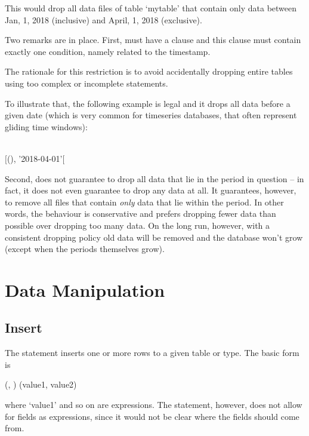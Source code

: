 This would drop all data files of table `mytable'
that contain only data between Jan, 1, 2018 (inclusive) and
April, 1, 2018 (exclusive). 

Two remarks are in place. First,
 must have a  clause
and this clause must contain exactly one condition,
namely  related to the timestamp.

The rationale for this restriction is
to avoid accidentally dropping entire tables
using too complex or incomplete  statements.

To illustrate that, the following example 
is legal and it drops all data
before a given date (which is very common
for timeseries databases, that often represent gliding
time windows):

\begin{minipage}{\textwidth}
  \\
$[$(), '2018-04-01'$[$
\end{minipage}

Second,  does not guarantee
to drop all data that lie in the period in question --
in fact, it does not even guarantee to drop any data at all.
It guarantees, however, to remove all files
that contain \emph{only} data that lie within the period.
In other words, the behaviour is conservative
and prefers dropping fewer data than possible over
dropping too many data.
On the long run, however, with a consistent dropping policy
old data will be removed and the database
won't grow (except when the periods themselves grow).

\section{Data Manipulation}
\subsection{Insert}
The  statement inserts one or more rows
to a given table or type.
The basic form is

  
                      (,
                       )
                      (value1, value2)

where `value1' and so on are expressions.
The  statement, however,
does not allow for fields as expressions,
since it would not be clear where the fields
should come from.

